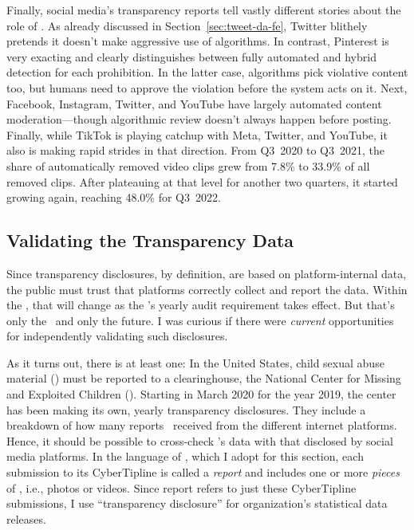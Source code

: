Finally, social media's transparency reports tell vastly different stories about
the role of \AI. As already discussed in Section~\ref{sec:tweet-da-fe}, Twitter
blithely pretends it doesn't make aggressive use of algorithms. In contrast,
Pinterest is very exacting and clearly distinguishes between fully automated and
hybrid detection for each prohibition. In the latter case, algorithms pick
violative content too, but humans need to approve the violation before the
system acts on it. Next, Facebook, Instagram, Twitter, and YouTube have largely
automated content moderation---though algorithmic review doesn't always happen
before posting. Finally, while TikTok is playing catchup with Meta, Twitter, and
YouTube, it also is making rapid strides in that direction. From Q3~2020 to
Q3~2021, the share of automatically removed video clips grew from 7.8\% to
33.9\% of all removed clips. After plateauing at that level for another two
quarters, it started growing again, reaching 48.0\% for Q3~2022.


\subsection{Validating the Transparency Data}
\label{sec:census-validation}

Since transparency disclosures, by definition, are based on platform-internal
data, the public must trust that platforms correctly collect and report the
data. Within the \EU, that will change as the \DSA's yearly audit requirement
takes effect. But that's only the \EU\ and only the future. I was curious if
there were \emph{current} opportunities for independently validating such
disclosures.

As it turns out, there is at least one: In the United States, child sexual abuse
material (\CSAM) must be reported to a clearinghouse, the National Center for
Missing and Exploited Children (\NCMEC). Starting in March 2020 for the year
2019, the center has been making its own, yearly transparency disclosures. They
include a breakdown of how many reports \NCMEC\ received from the different
internet platforms. Hence, it should be possible to cross-check \NCMEC's data
with that disclosed by social media platforms. In the language of \NCMEC, which
I adopt for this section, each submission to its CyberTipline is called a
\emph{report} and includes one or more \emph{pieces} of \CSAM, i.e., photos or
videos. Since report refers to just these CyberTipline submissions, I use
``transparency disclosure'' for organization's statistical data releases.

